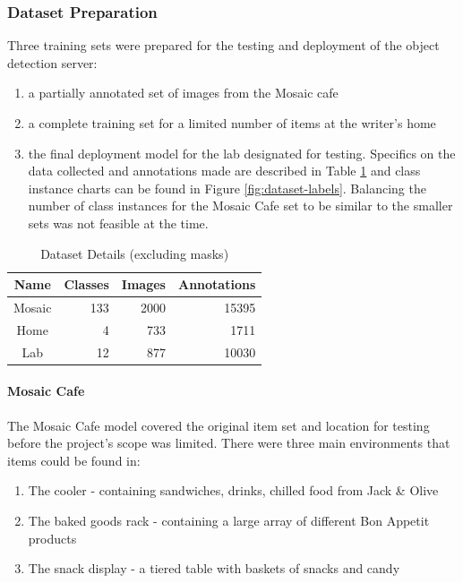 \documentclass[thesis]{fputhesis}
\newcommand{\ra}[1]{\renewcommand{\arraystretch}{#1}}
\begin{document}
\begin{body}
\subsubsection{Dataset Preparation}
Three training sets were prepared for the testing and deployment of the object detection server: 
\begin{enumerate}
    \item a partially annotated set of images from the Mosaic cafe 
    \item a complete training set for a limited number of items at the writer's home
    \item the final deployment model for the lab designated for testing. 
Specifics on the data collected and annotations made are described in Table \ref{tab:Dataset_info} and class instance charts can be found in Figure \ref{fig:dataset-labels}. Balancing the number of class instances for the Mosaic Cafe set to be similar to the smaller sets was not feasible at the time.
\end{enumerate}

\begin{table}[h]\centering
    \ra{1.2}
    \caption{Dataset Details (excluding masks)}\label{tab:Dataset_info}
    \begin{tabular}{@{}crrr@{}}
        \toprule
        \textbf{Name} & \textbf{Classes} & \textbf{Images} & \textbf{Annotations}\\ \midrule
        Mosaic & 133 & 2000 & 15395\\
        Home & 4 & 733 & 1711\\
        Lab & 12 & 877 & 10030\\
        \bottomrule
    \end{tabular}
\end{table}

\paragraph{Mosaic Cafe}
The Mosaic Cafe model covered the original item set and location for testing before the project's scope was limited. There were three main environments that items could be found in:
\begin{enumerate}
    \item The cooler - containing sandwiches, drinks, chilled food from Jack \& Olive
    \item The baked goods rack - containing a large array of different Bon Appetit products
    \item The snack display - a tiered table with baskets of snacks and candy
\end{enumerate}


\end{body}
\end{document}
